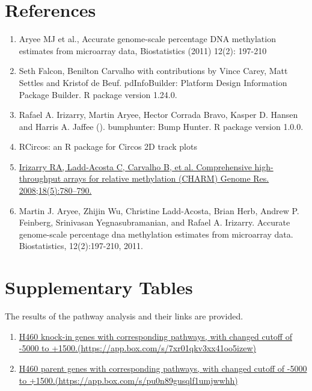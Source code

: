 \documentclass[11pt]{article}
\begin{document}
\section*{References}  
\begin{enumerate}


	\item  Aryee MJ et al., Accurate genome-scale percentage DNA methylation estimates
	  from microarray data, Biostatistics (2011) 12(2): 197-210 	

	\item  Seth Falcon, Benilton Carvalho with contributions by Vince Carey, Matt
	  Settles and Kristof de Beuf. pdInfoBuilder: Platform Design Information
	  Package Builder. R package version 1.24.0.
	
	\item   Rafael A. Irizarry, Martin Aryee, Hector Corrada Bravo, Kasper D. Hansen and	Harris A. Jaffee (). bumphunter: Bump Hunter. R package version 1.0.0.
		
	\item RCircos: an R package for Circos 2D track plots
	


	\item \href{http://www.ncbi.nlm.nih.gov/pmc/articles/PMC2336799/}{Irizarry RA, Ladd-Acosta C, Carvalho B, et al. Comprehensive high-throughput arrays for relative methylation (CHARM) Genome Res. 2008;18(5):780–790.} 
	
	\item Martin J. Aryee, Zhijin Wu, Christine Ladd-Acosta, Brian Herb, Andrew P.
Feinberg, Srinivasan Yegnasubramanian, and Rafael A. Irizarry. Accurate
genome-scale percentage dna methylation estimates from microarray data.
Biostatistics, 12(2):197-210, 2011.

\end{enumerate}



\section*{Supplementary Tables}  

The results of the pathway analysis and their links are provided.

\begin{enumerate}

	\item \href{https://app.box.com/s/7xr01qkv3xx41oo5izew}{H460 knock-in genes with corresponding pathways, with changed cutoff of -5000 to +1500.(https://app.box.com/s/7xr01qkv3xx41oo5izew)} 
%	
	\item \href{https://app.box.com/s/pu0n89gusqlf1umjwwhh}{H460 parent genes with corresponding pathways,  with changed cutoff of -5000 to +1500.(https://app.box.com/s/pu0n89gusqlf1umjwwhh)}
\end{enumerate}

 

 
\end{document}
